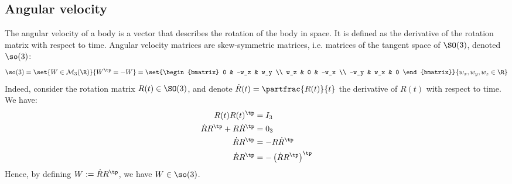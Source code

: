 \subsection{Angular velocity}
The angular velocity of a body is a vector that describes the rotation of the body in space. It is defined as the derivative of the rotation matrix with respect to time. Angular velocity matrices are skew-symmetric matrices, i.e. matrices of the tangent space of $\SO(3)$, denoted $\so(3)$:
\begin{equation*}
    \so(3) = \set{W\in\mathcal{M}_3(\R)}{W^\tp=-W} = \set{\begin{bmatrix}
        0 & -w_z & w_y \\
        w_z & 0 & -w_x \\
        -w_y & w_x & 0
    \end{bmatrix}}{w_x, w_y, w_z\in\R}
\end{equation*}
Indeed, consider the rotation matrix $R(t)\in\SO(3)$, and denote $\dot R(t) = \partfrac{R(t)}{t}$ the derivative of $R(t)$ with respect to time. We have:
\begin{align*}
    R(t)R(t)^\tp &= I_3 \\
    \dot RR^\tp + R\dot R^\tp &= 0_3 \\
    \dot RR^\tp &= -R\dot R^\tp \\
    \dot RR^\tp &= -\left(\dot RR^\tp\right)^\tp \\
\end{align*}
Hence, by defining $W := \dot RR^\tp$, we have $W\in\so(3)$.

